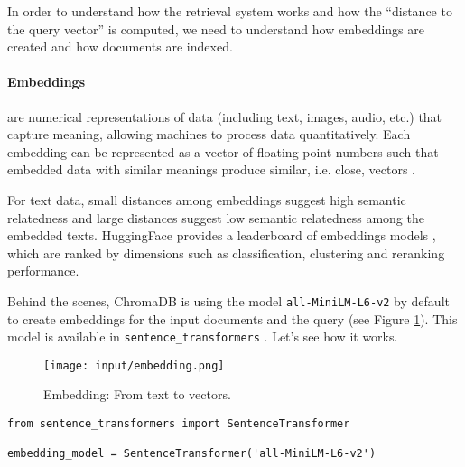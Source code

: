 In order to understand how the retrieval system works and how the ``distance to the query vector'' is computed, we need to understand how embeddings are created and how documents are indexed.


\paragraph{Embeddings} are numerical representations of data (including text, images, audio, etc.) that capture meaning, allowing machines to process data quantitatively. Each embedding can be represented as a vector of floating-point numbers such that embedded data with similar meanings produce similar, i.e. close, vectors .

For text data, small distances among embeddings suggest high semantic relatedness and large distances suggest low semantic relatedness among the embedded texts. HuggingFace provides a leaderboard of embeddings models , which are ranked by dimensions such as classification, clustering and reranking performance.

Behind the scenes, ChromaDB is using the model \texttt{all-MiniLM-L6-v2} by default  to create embeddings for the input documents and the query (see Figure \ref{embedding}). This model is available in \texttt{sentence\_transformers} . Let's see how it works.



\begin{figure}[H]
\centering
\texttt{[image: input/embedding.png]}
\caption{Embedding: From text to vectors.}
\label{embedding}
\end{figure}

\begin{verbatim}
from sentence_transformers import SentenceTransformer

embedding_model = SentenceTransformer('all-MiniLM-L6-v2')
\end{verbatim}

